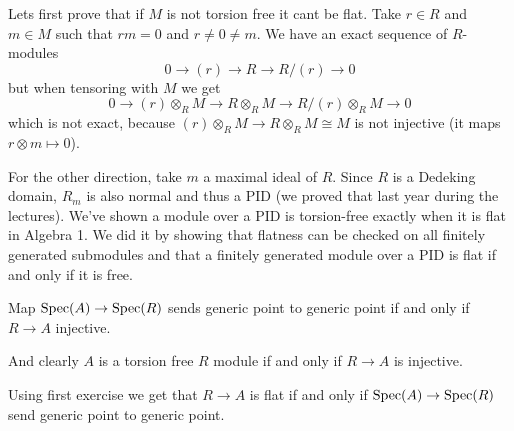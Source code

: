 \newcommand{\sheet}{1}




\maketitle{}

\begin{exercise}{1}
    Lets first prove that if $M$ is not torsion free it cant be flat. Take $r
    \in R$ and $m \in M$ such that $r m = 0$ and $r \not= 0 \not= m$.
    We have an exact sequence of $R$-modules
    \begin{equation*}
        0 \to (r) \to R \to R / (r) \to 0
    \end{equation*}
    but when tensoring with $M$ we get
    \begin{equation*}
        0 \to (r) \otimes_R M \to R \otimes_R M \to R / (r) \otimes_R M \to 0
    \end{equation*}
    which is not exact, because $(r) \otimes_R M \to R \otimes_R M \cong M$ is
    not injective (it maps $r \otimes m \mapsto 0$).

    For the other direction, take $m$ a maximal ideal of $R$. Since $R$ is a
    Dedeking domain, $R_m$ is also normal and thus a PID (we proved that last
    year during the lectures). We've shown a module over a PID is torsion-free
    exactly when it is flat in Algebra 1.
    We did it by showing that flatness can be checked on all finitely generated
    submodules and that a finitely generated module over a PID is flat if and
    only if it is free.
\end{exercise}

\begin{exercise}{2}
    Map $\operatorname{Spec}(A) \to \operatorname{Spec}(R)$ sends generic point to
    generic point if and only if $R \to A$ injective.
    
    And clearly $A$ is a torsion free $R$ module if and only if $R \to A$ is
    injective.

    Using first exercise we get that $R \to A$ is flat if and only if $\operatorname{Spec}(A)
    \to \operatorname{Spec}(R)$ send generic point to generic point.
\end{exercise}

